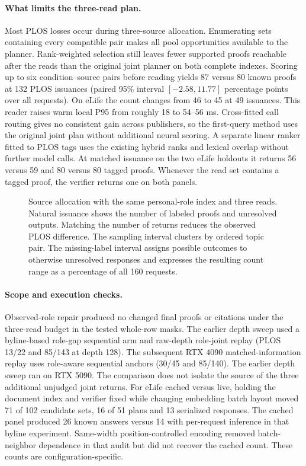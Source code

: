 \documentclass[sigconf,natbib=true,anonymous=true,pbalance=true]{acmart}
\begin{document}
\paragraph{What limits the three-read plan.}
Most PLOS losses occur during three-source allocation. Enumerating sets containing every compatible pair makes all pool opportunities available to the planner. Rank-weighted selection still leaves fewer supported proofs reachable after the reads than the original joint planner on both complete indexes. Scoring up to six condition--source pairs before reading yields 87 versus 80 known proofs at 132 PLOS issuances (paired 95\% interval $[-2.58,11.77]$ percentage points over all requests). On eLife the count changes from 46 to 45 at 49 issuances. This reader raises warm local P95 from roughly 18 to 54--56 ms. Cross-fitted call routing gives no consistent gain across publishers, so the first-query method uses the original joint plan without additional neural scoring. A separate linear ranker fitted to PLOS tags uses the existing hybrid ranks and lexical overlap without further model calls. At matched issuance on the two eLife holdouts it returns 56 versus 59 and 80 versus 80 tagged proofs. Whenever the read set contains a tagged proof, the verifier returns one on both panels.

\begin{figure}[t]
\centering

\caption{Source allocation with the same personal-role index and three reads. Natural issuance shows the number of labeled proofs and unresolved outputs. Matching the number of returns reduces the observed PLOS difference. The sampling interval clusters by ordered topic pair. The missing-label interval assigns possible outcomes to otherwise unresolved responses and expresses the resulting count range as a percentage of all 160 requests.}
\label{fig:matched-coverage}
\end{figure}

\paragraph{Scope and execution checks.}
Observed-role repair produced no changed final proofs or citations under the three-read budget in the tested whole-row masks. The earlier depth sweep used a byline-based role-gap sequential arm and raw-depth role-joint replay (PLOS 13/22 and 85/143 at depth 128). The subsequent RTX 4090 matched-information replay uses role-aware sequential anchors (30/45 and 85/140). The earlier depth sweep ran on RTX 5090. The comparison does not isolate the source of the three additional unjudged joint returns. For eLife cached versus live, holding the document index and verifier fixed while changing embedding batch layout moved 71 of 102 candidate sets, 16 of 51 plans and 13 serialized responses. The cached panel produced 26 known answers versus 14 with per-request inference in that byline experiment. Same-width position-controlled encoding removed batch-neighbor dependence in that audit but did not recover the cached count. These counts are configuration-specific.
\end{document}
